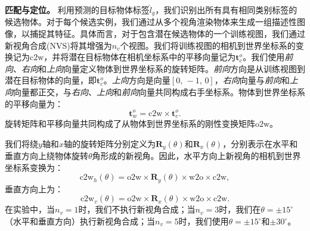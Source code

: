 \textbf{匹配与定位。} 利用预测的目标物体标签$\hat{l}_g$，我们识别出所有具有相同类别标签的候选物体。对于每个候选实例，我们通过从多个视角渲染物体来生成一组描述性图像，以捕捉其特征。具体而言，对于包含潜在候选物体的一个训练视图，我们通过新视角合成(NVS)将其增强为$n_v$个视图。我们将训练视图的相机到世界坐标系的变换记为$\text{c2w}$，并将潜在目标物体在相机坐标系中的平移向量记为$\mathbf{t}^{o}_{c}$。我们使用\textit{前向}、\textit{右向}和\textit{上向}向量定义物体到世界坐标系的旋转矩阵。\textit{前向}方向是从训练视图到潜在目标物体的向量，即$\mathbf{t}^{o}_{c}$。\textit{上向}方向是向量$[0,\,-1,\,0]$，\textit{右向}向量与\textit{前向}和\textit{上向}向量都正交，与\textit{右向}、\textit{上向}和\textit{前向}向量共同构成右手坐标系。物体到世界坐标系的平移向量为：
    \begin{equation}
        \mathbf{t}^{o}_{w} = \text{c2w} \times \mathbf{t}^{o}_{c}.
        \label{equ:NVS0}
\end{equation}
旋转矩阵和平移向量共同构成了从物体到世界坐标系的刚性变换矩阵$\text{o2w}$。

我们将绕$y$轴和$x$轴的旋转矩阵分别定义为$\mathbf{R}_y(\theta)$和$\mathbf{R}_x(\theta)$，分别表示在水平和垂直方向上绕物体旋转$\theta$角形成的新视角。因此，水平方向上新视角的相机到世界坐标系变换为：
\begin{equation}
    \text{c2w}_h(\theta) = \text{o2w} \times \mathbf{R}_y(\theta) \times \text{w2o} \times \text{c2w},
    \label{equ:NVS1}
\end{equation}
垂直方向上为：
\begin{equation}
    \text{c2w}_v(\theta) = \text{o2w} \times \mathbf{R}_x(\theta) \times \text{w2o} \times \text{c2w}.
    \label{equ:NVS2}
\end{equation}
在实验中，当$n_v=1$时，我们不执行新视角合成；当$n_v=3$时，我们在$\theta = \pm15^\circ$（水平和垂直方向）执行新视角合成；当$n_v=5$时，我们使用$\theta = \pm15^\circ$和$\pm30^\circ$。

